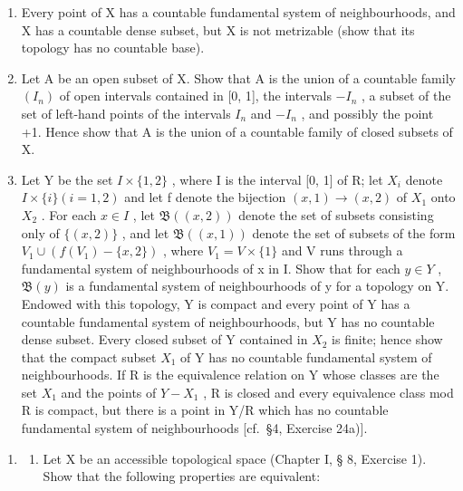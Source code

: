 \begin{enumerate}
\def\labelenumi{\alph{enumi})}
\setcounter{enumi}{1}
\item
  Every point of X has a countable fundamental system of neighbourhoods, and X has a countable dense subset, but X is not metrizable (show that its topology has no countable base).
\item
  Let A be an open subset of X. Show that A is the union of a countable family \((I_{n})\) of open intervals contained in {[}0, 1{]}, the intervals \(-I_{n}\) , a subset of the set of left-hand points of the intervals \(I_{n}\) and \(-I_{n}\) , and possibly the point +1. Hence show that A is the union of a countable family of closed subsets of X.
\item
  Let Y be the set \(I \times \{1, 2\}\) , where I is the interval {[}0, 1{]} of R; let \(X_{i}\) denote \(I \times \{i\} (i = 1, 2)\) and let f denote the bijection \((x, 1) \to (x, 2)\) of \(X_{1}\) onto \(X_{2}\) . For each \(x \in I\) , let \(\mathfrak{B}((x, 2))\) denote the set of subsets consisting only of \(\{(x, 2)\}\) , and let \(\mathfrak{B}((x, 1))\) denote the set of subsets of the form \(V_{1} \cup (f(V_{1}) - \{x, 2\})\) , where \(V_{1} = V \times \{1\}\) and V runs through a fundamental system of neighbourhoods of x in I. Show that for each \(y \in Y\) , \(\mathfrak{B}(y)\) is a fundamental system of neighbourhoods of y for a topology on Y. Endowed with this topology, Y is compact and every point of Y has a countable fundamental system of neighbourhoods, but Y has no countable dense subset. Every closed subset of Y contained in \(X_{2}\) is finite; hence show that the compact subset \(X_{1}\) of Y has no countable fundamental system of neighbourhoods. If R is the equivalence relation on Y whose classes are the set \(X_{1}\) and the points of \(Y - X_{1}\) , R is closed and every equivalence class mod R is compact, but there is a point in Y/R which has no countable fundamental system of neighbourhoods {[}cf.~§4, Exercise 24a){]}.
\end{enumerate}

\begin{enumerate}
\def\labelenumi{\arabic{enumi})}
\setcounter{enumi}{13}
\tightlist
\item
  \begin{enumerate}
  \def\labelenumii{\alph{enumii})}
  \tightlist
  \item
    Let X be an accessible topological space (Chapter I, § 8, Exercise 1). Show that the following properties are equivalent:
  \end{enumerate}
\end{enumerate}

